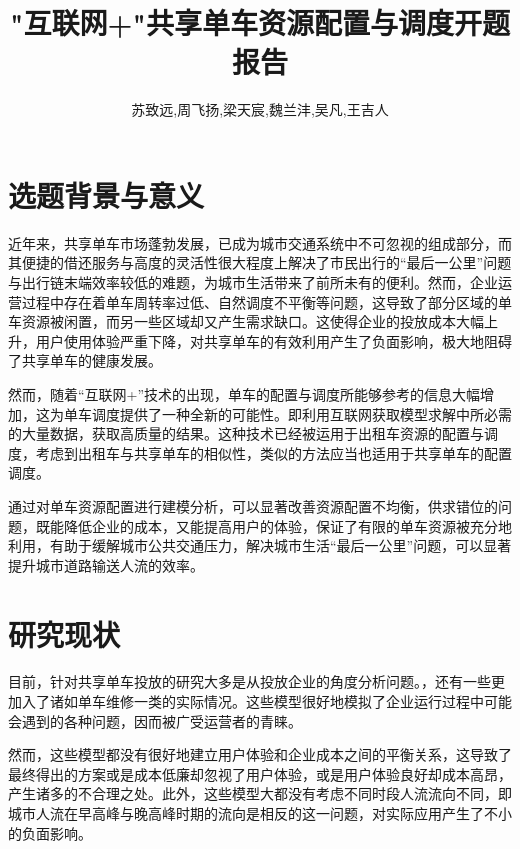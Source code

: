 \documentclass [16pt,cn,a4paper,bibtex]{elegantpaper}
\title{"互联网+"共享单车资源配置与调度开题报告}
\author{苏致远,周飞扬,梁天宸,魏兰沣,吴凡,王吉人}
\date{\zhtoday}
\begin{document}
\maketitle

\begin{abstract}
\begin{center}
\end{center}
\end{abstract}


\section{选题背景与意义}

近年来，共享单车市场蓬勃发展，已成为城市交通系统中不可忽视的组成部分，而其便捷的借还服务与高度的灵活性很大程度上解决了市民出行的“最后一公里”问题与出行链末端效率较低的难题，为城市生活带来了前所未有的便利。然而，企业运营过程中存在着单车周转率过低、自然调度不平衡等问题，这导致了部分区域的单车资源被闲置，而另一些区域却又产生需求缺口。这使得企业的投放成本大幅上升，用户使用体验严重下降，对共享单车的有效利用产生了负面影响，极大地阻碍了共享单车的健康发展。

然而，随着“互联网+”技术的出现，单车的配置与调度所能够参考的信息大幅增加，这为单车调度提供了一种全新的可能性。即利用互联网获取模型求解中所必需的大量数据，获取高质量的结果。这种技术已经被运用于出租车资源的配置与调度\textsuperscript{\cite{安晓丹2015互联网+}}，考虑到出租车与共享单车的相似性，类似的方法应当也适用于共享单车的配置调度。

通过对单车资源配置进行建模分析，可以显著改善资源配置不均衡，供求错位的问题，既能降低企业的成本，又能提高用户的体验，保证了有限的单车资源被充分地利用，有助于缓解城市公共交通压力，解决城市生活“最后一公里”问题，可以显著提升城市道路输送人流的效率。

\section{研究现状}

目前，针对共享单车投放的研究大多是从投放企业的角度分析问题。\textsuperscript{\cite{于德新2020共享单车调度模型及算法研究}\cite{陈佳惠2021共享单车调度路径优化研究}}，还有一些更加入了诸如单车维修一类的实际情况。\textsuperscript{\cite{王涵霄2019考虑维修的共享单车调度优化研究}}这些模型很好地模拟了企业运行过程中可能会遇到的各种问题，因而被广受运营者的青睐。

然而，这些模型都没有很好地建立用户体验和企业成本之间的平衡关系，这导致了最终得出的方案或是成本低廉却忽视了用户体验，或是用户体验良好却成本高昂，产生诸多的不合理之处。此外，这些模型大都没有考虑不同时段人流流向不同，即城市人流在早高峰与晚高峰时期的流向是相反的这一问题，对实际应用产生了不小的负面影响。
\end{document}
